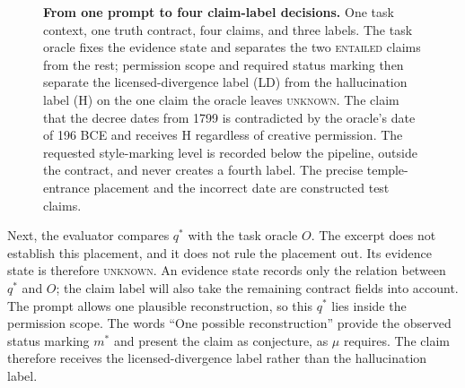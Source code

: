 \documentclass{clv2025}
\newcommand{\LD}{\textsc{LD}}
\newcommand{\Hall}{\textsc{H}}
\begin{document}
\begin{figure}[!t]
{}
\caption{\textbf{From one prompt to four claim-label decisions.}
One task context, one truth contract, four claims, and three labels. The task
oracle fixes the evidence state and separates the two \textsc{entailed} claims
from the rest; permission scope and required status marking then separate the
licensed-divergence label (\LD) from the hallucination label (\Hall) on the one
claim the oracle leaves \textsc{unknown}. The claim that the decree dates from
1799 is contradicted by the oracle's date of 196 BCE and receives \Hall{}
regardless of creative permission. The requested style-marking level is
recorded below the pipeline,
outside the contract, and never creates a fourth label. The precise temple-
entrance placement and the incorrect date are constructed test claims.}
\label{fig:claim-label-annotation}
\end{figure}
\FloatBarrier

Next, the evaluator compares $q^*$ with the task oracle $O$. The excerpt does
not establish this placement, and it does not rule the placement out. Its
evidence state is therefore \textsc{unknown}. An evidence state records only the
relation between $q^*$ and $O$; the claim label will also take the remaining
contract fields into account. The prompt allows one plausible reconstruction,
so this $q^*$ lies inside the permission scope. The words ``One possible
reconstruction'' provide the observed status marking $m^*$ and present the
claim as conjecture, as $\mu$ requires. The claim therefore receives the
licensed-divergence label rather than the hallucination label.
\end{document}
